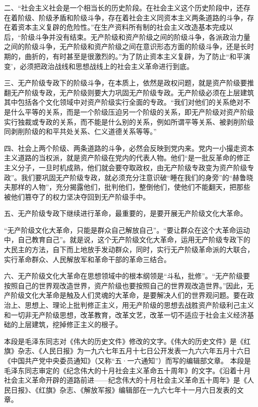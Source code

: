 二、“社会主义社会是一个相当长的历史阶段。在社会主义这个历史阶段中，还存在着阶级、阶级矛盾和阶级斗争，存在着社会主义同资本主义两条道路的斗争，存在着资本主义复辟的危险性。”在生产资料所有制的社会主义改造基本完成以后，“阶级斗争并没有结束。无产阶级和资产阶级之间的阶级斗争，各派政治力量之间的阶级斗争，无产阶级和资产阶级之间在意识形态方面的阶级斗争，还是长时期的，曲折的，有时甚至是很激烈的。”为了防止资本主义复辟，为了防止“和平演变’，必须把政治战线和思想战线上的社会主义革命进行到底。

三、无产阶级专政下的阶级斗争，在本质上，依然是政权问题，就是资产阶级要推翻无产阶级专政，无产阶级则要大力巩固无产阶级专政。无产阶级必须在上层建筑其中包括各个文化领域中对资产阶级实行全面的专政。“我们对他们的关系绝对不是什么平等的关系，而是一个阶级压迫另一个阶级的关系，即无产阶级对资产阶级实行独裁或专政的关系，而不能是什么别的关系，例如所谓平等关系、被剥削阶级同剥削阶级的和平共处关系、仁义道德关系等等。”

四、社会上两个阶级、两条道路的斗争，必然会反映到党内来。党内一小撮走资本主义道路的当权派，就是资产阶级在党内的代表人物。他们“是一批反革命的修正主义分子，一旦时机成熟，他们就会要夺取政权，由无产阶级专政变为资产阶级专政”。我们要巩固无产阶级专政，就必须充分注意识破“睡在我们的身旁”的“赫鲁晓夫那样的人物”，充分揭露他们，批判他们，整倒他们，使他们不能翻天，把那些被他们篡夺了的权力坚决夺回到无产阶级手中。

五、无产阶级专政下继续进行革命，最重要的，是要开展无产阶级文化大革命。

“无产阶级文化大革命，只能是群众自己解放自己”。“要让群众在这个大革命运动中，自己教育自己”。就是说，这个无产阶级文化大革命，运用无产阶级专政下的大民主的方法，自下而上地放手发动群众，同时，实行无产阶级革命派的大联合，实行革命群众、人民解放军和革命干部的革命三结合。

六、无产阶级文化大革命在思想领域中的根本纲领是“斗私，批修”。“无产阶级要按照自己的世界观改造世界，资产阶级也要按照自己的世界观改造世界。”因此，无产阶级文化大革命是触及人们灵魂的大革命，是要解决人们的世界观问题。要在政治上、思想上、理论上批判修正主义，用无产阶级的思想去战胜资产阶级利己主义和一切非无产阶级思想，改革教育，改革文艺，改革一切不适应于社会主义经济基础的上层建筑，挖掉修正主义的根子。

\begin{maonote}
本段是毛泽东同志对《伟大的历史文件》修改的文字。《伟大的历史文件》是《红旗》杂志、《人民日报》为一九六七年五月十七日公开发表一九六六年五月十六日《中国共产党中央委员通知》（又称“五·一六通知”）而写的编辑部文章。
本段是毛泽东同志审定的《纪念伟大的十月社会主义革命五十周年》的文字。《沿着十月社会主义革命开辟的道路前进——纪念伟大的十月社会主义革命五十周年》是《人民日报》、《红旗》杂志、《解放军报》编辑部在一九六七年十一月六日发表的文章。
\end{maonote}
